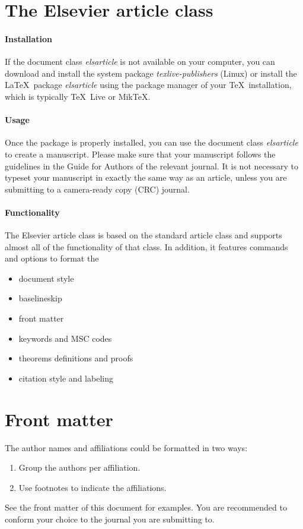 \documentclass[review]{elsarticle}
\begin{document}
\linenumbers

\section{The Elsevier article class}

\paragraph{Installation} If the document class \emph{elsarticle} is not available on your computer, you can download and install the system package \emph{texlive-publishers} (Linux) or install the \LaTeX\ package \emph{elsarticle} using the package manager of your \TeX\ installation, which is typically \TeX\ Live or Mik\TeX.

\paragraph{Usage} Once the package is properly installed, you can use the document class \emph{elsarticle} to create a manuscript. Please make sure that your manuscript follows the guidelines in the Guide for Authors of the relevant journal. It is not necessary to typeset your manuscript in exactly the same way as an article, unless you are submitting to a camera-ready copy (CRC) journal.

\paragraph{Functionality} The Elsevier article class is based on the standard article class and supports almost all of the functionality of that class. In addition, it features commands and options to format the
\begin{itemize}
\item document style
\item baselineskip
\item front matter
\item keywords and MSC codes
\item theorems definitions and proofs
\item citation style and labeling
\end{itemize}

\section{Front matter}

The author names and affiliations could be formatted in two ways:
\begin{enumerate}[(1)]
\item Group the authors per affiliation.
\item Use footnotes to indicate the affiliations.
\end{enumerate}
See the front matter of this document for examples. You are recommended to conform your choice to the journal you are submitting to.
\end{document}
